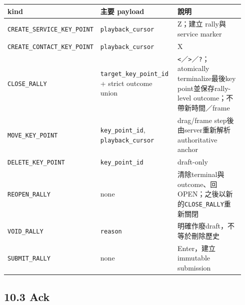 \documentclass[
  9pt,
  a4paper,
]{article}
\begin{document}
\begin{longtable}[]{@{}>{\RaggedRight\arraybackslash}p{0.18\linewidth}>{\RaggedRight\arraybackslash}p{0.34\linewidth}>{\RaggedRight\arraybackslash}p{0.42\linewidth}@{}}
\toprule\noalign{}
kind & 主要 payload & 說明 \\
\midrule\noalign{}
\endhead
\bottomrule\noalign{}
\endlastfoot
\texttt{CREATE\_\allowbreak{}SERVICE\_\allowbreak{}KEY\_\allowbreak{}POINT} & \texttt{playback\_\allowbreak{}cursor} &
Z；建立 rally與service marker \\
\texttt{CREATE\_\allowbreak{}CONTACT\_\allowbreak{}KEY\_\allowbreak{}POINT} & \texttt{playback\_\allowbreak{}cursor} &
X \\
\texttt{CLOSE\_\allowbreak{}RALLY} &
\texttt{target\_\allowbreak{}key\_\allowbreak{}point\_\allowbreak{}id} + strict outcome union &
\texttt{\textless{}}／\texttt{\textgreater{}}／\texttt{?}；atomically terminalize最後key point並保存rally-level outcome；不帶新時間／frame \\
\texttt{MOVE\_\allowbreak{}KEY\_\allowbreak{}POINT} & \texttt{key\_\allowbreak{}point\_\allowbreak{}id},
\texttt{playback\_\allowbreak{}cursor} & drag/frame
step後由server重新解析authoritative anchor \\
\texttt{DELETE\_\allowbreak{}KEY\_\allowbreak{}POINT} & \texttt{key\_\allowbreak{}point\_\allowbreak{}id} & draft-only \\
\texttt{REOPEN\_\allowbreak{}RALLY} & none & 清除terminal與outcome、回OPEN；之後以新的\texttt{CLOSE\_\allowbreak{}RALLY}重新關閉 \\
\texttt{VOID\_\allowbreak{}RALLY} & \texttt{reason} &
明確作廢draft，不等於刪除歷史 \\
\texttt{SUBMIT\_\allowbreak{}RALLY} & none & Enter，建立immutable submission \\
\end{longtable}

\subsection{10.3 Ack}\label{103-ack}
\end{document}
